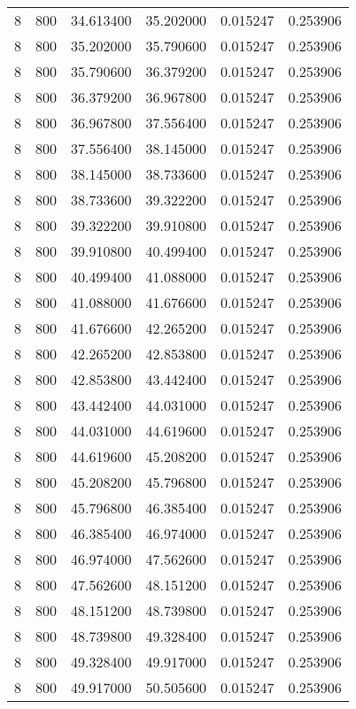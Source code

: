 \begin{longtable}{rrrrrr}
8 & 800 & 34.613400 & 35.202000 & 0.015247 & 0.253906 \\
8 & 800 & 35.202000 & 35.790600 & 0.015247 & 0.253906 \\
8 & 800 & 35.790600 & 36.379200 & 0.015247 & 0.253906 \\
8 & 800 & 36.379200 & 36.967800 & 0.015247 & 0.253906 \\
8 & 800 & 36.967800 & 37.556400 & 0.015247 & 0.253906 \\
8 & 800 & 37.556400 & 38.145000 & 0.015247 & 0.253906 \\
8 & 800 & 38.145000 & 38.733600 & 0.015247 & 0.253906 \\
8 & 800 & 38.733600 & 39.322200 & 0.015247 & 0.253906 \\
8 & 800 & 39.322200 & 39.910800 & 0.015247 & 0.253906 \\
8 & 800 & 39.910800 & 40.499400 & 0.015247 & 0.253906 \\
8 & 800 & 40.499400 & 41.088000 & 0.015247 & 0.253906 \\
8 & 800 & 41.088000 & 41.676600 & 0.015247 & 0.253906 \\
8 & 800 & 41.676600 & 42.265200 & 0.015247 & 0.253906 \\
8 & 800 & 42.265200 & 42.853800 & 0.015247 & 0.253906 \\
8 & 800 & 42.853800 & 43.442400 & 0.015247 & 0.253906 \\
8 & 800 & 43.442400 & 44.031000 & 0.015247 & 0.253906 \\
8 & 800 & 44.031000 & 44.619600 & 0.015247 & 0.253906 \\
8 & 800 & 44.619600 & 45.208200 & 0.015247 & 0.253906 \\
8 & 800 & 45.208200 & 45.796800 & 0.015247 & 0.253906 \\
8 & 800 & 45.796800 & 46.385400 & 0.015247 & 0.253906 \\
8 & 800 & 46.385400 & 46.974000 & 0.015247 & 0.253906 \\
8 & 800 & 46.974000 & 47.562600 & 0.015247 & 0.253906 \\
8 & 800 & 47.562600 & 48.151200 & 0.015247 & 0.253906 \\
8 & 800 & 48.151200 & 48.739800 & 0.015247 & 0.253906 \\
8 & 800 & 48.739800 & 49.328400 & 0.015247 & 0.253906 \\
8 & 800 & 49.328400 & 49.917000 & 0.015247 & 0.253906 \\
8 & 800 & 49.917000 & 50.505600 & 0.015247 & 0.253906 \\

\end{longtable}
